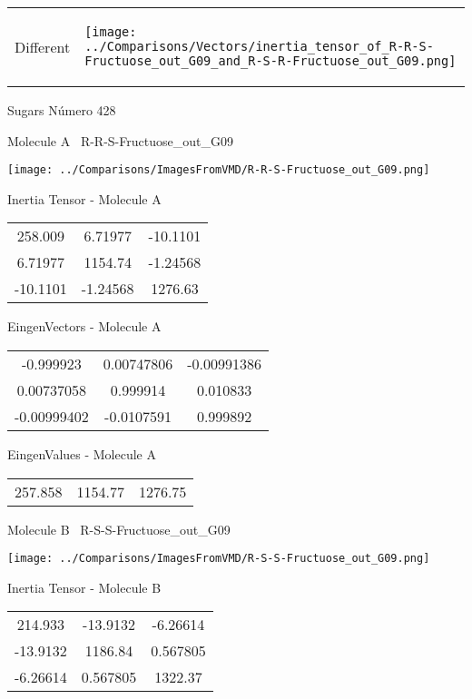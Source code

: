 \vtab[-5mm]
\begin{tabular}{*{2}{m{}}}
\begin{center}
\textcolor{NavyBlue}{\Large Different}
\end{center}
&
\begin{center}
\texttt{[image: ../Comparisons/Vectors/inertia\_tensor\_of\_R-R-S-Fructuose\_out\_G09\_and\_R-S-R-Fructuose\_out\_G09.png]}
\end{center}
\end{tabular}

 \newpage

\vtab[-3cm]
\begin{center}
{\large Sugars \tab Número 428}
\end{center}
\begin{multicols}{2}
\begin{center}

Molecule A \
R-R-S-Fructuose\_out\_G09

\texttt{[image: ../Comparisons/ImagesFromVMD/R-R-S-Fructuose\_out\_G09.png]}

Inertia Tensor - Molecule A \\
\begin{tabular}{|c c c|}
258.009	 & 	6.71977	 & 	-10.1101	 \\
6.71977	 & 	1154.74	 & 	-1.24568	 \\
-10.1101	 & 	-1.24568	 & 	1276.63
\end{tabular}

\vtab
 EingenVectors - Molecule A     \\
\begin{tabular}{|c c c|}
-0.999923	 & 	0.00747806	 & 	-0.00991386	 \\
0.00737058	 & 	0.999914	 & 	0.010833	 \\
-0.00999402	 & 	-0.0107591	 & 	0.999892
\end{tabular}

\vtab
 EingenValues - Molecule A     \\
\begin{tabular}{|c c c|}
257.858	 & 	1154.77	 & 	1276.75	 \\
\end{tabular}
\columnbreak

Molecule B \
R-S-S-Fructuose\_out\_G09

\texttt{[image: ../Comparisons/ImagesFromVMD/R-S-S-Fructuose\_out\_G09.png]}

Inertia Tensor - Molecule B \\
\begin{tabular}{|c c c|}
214.933	 & 	-13.9132	 & 	-6.26614	 \\
-13.9132	 & 	1186.84	 & 	0.567805	 \\
-6.26614	 & 	0.567805	 & 	1322.37
\end{tabular}


\end{center}
\end{multicols}
